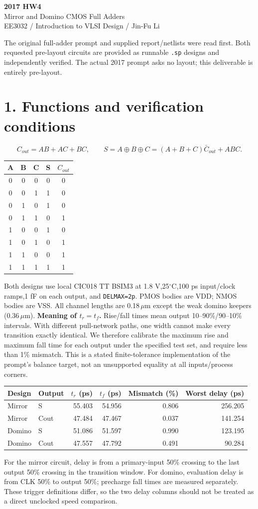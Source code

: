 \documentclass[11pt,a4paper]{article}
\begin{document}
\begin{center}{\LARGE\bfseries 2017 HW4}\\[4pt]{\large Mirror and Domino CMOS Full Adders}\\[4pt]{\small EE3032 / Introduction to VLSI Design / Jin-Fu Li}\end{center}
The original full-adder prompt and supplied report/netlists were read first. Both requested pre-layout circuits are provided as runnable \texttt{.sp} designs and independently verified. The actual 2017 prompt asks no layout; this deliverable is entirely pre-layout.
\section*{1. Functions and verification conditions}
\[
 C_{out}=AB+AC+BC,\qquad S=A\oplus B\oplus C
 =(A+B+C)\bar C_{out}+ABC.
\]
\begin{center}\begin{tabular}{ccc|cc}\toprule
A&B&C&S&$C_{out}$\\\midrule
0&0&0&0&0\\0&0&1&1&0\\0&1&0&1&0\\0&1&1&0&1\\
1&0&0&1&0\\1&0&1&0&1\\1&1&0&0&1\\1&1&1&1&1\\\bottomrule
\end{tabular}\end{center}
Both designs use local CIC018 TT BSIM3 at 1.8 V,25$^\circ$C,100 ps input/clock ramps,1 fF on each output, and \texttt{DELMAX=2p}. PMOS bodies are VDD; NMOS bodies are VSS. All channel lengths are 0.18$\,\mu$m except the weak domino keepers (0.36$\,\mu$m).
\textbf{Meaning of $t_r=t_f$.} Rise/fall times mean output 10--90\%/90--10\% intervals. With different pull-network paths, one width cannot make every transition exactly identical. We therefore calibrate the maximum rise and maximum fall time for each output under the specified test set, and require less than 1\% mismatch. This is a stated finite-tolerance implementation of the prompt's balance target, not an unsupported equality at all inputs/process corners.
\begin{center}\begin{tabular}{llrrrr}\toprule
Design&Output&$t_r$ (ps)&$t_f$ (ps)&Mismatch (\%)&Worst delay (ps)\\\midrule
Mirror&S&55.403&54.956&0.806&256.205\\
Mirror&Cout&47.484&47.467&0.037&141.254\\
Domino&S&51.086&51.597&0.990&123.195\\
Domino&Cout&47.557&47.792&0.491&90.284\\
\bottomrule\end{tabular}\end{center}
For the mirror circuit, delay is from a primary-input 50\% crossing to the last output 50\% crossing in the transition window. For domino, evaluation delay is from CLK 50\% to output 50\%; precharge fall times are measured separately. These trigger definitions differ, so the two delay columns should not be treated as a direct unclocked speed comparison.
\newpage
\end{document}
